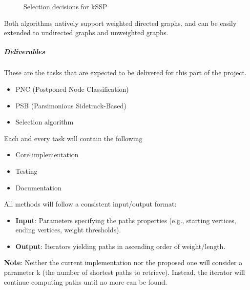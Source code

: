 \begin{figure}[ht]
    \centering

    \caption{Selection decisions for kSSP}
\end{figure}

Both algorithms natively support weighted directed graphs, and can be easily
extended to undirected graphs and unweighted graphs.

\subparagraph{Deliverables}
These are the tasks that are expected to be delivered for this part of the
project.

\begin{itemize}
    \item PNC (Postponed Node Classification)
    \item PSB (Parsimonious Sidetrack-Based)
    \item Selection algorithm
\end{itemize}

Each and every task will contain the following

\begin{itemize}
    \item Core implementation
    \item Testing
    \item Documentation
\end{itemize}

All methods will follow a consistent input/output format:
\begin{itemize}
    \item \textbf{Input}: Parameters specifying the paths properties (e.g., starting vertices, ending vertices, weight thresholds).
    \item \textbf{Output}: Iterators yielding paths in ascending order of weight/length.
\end{itemize}

\textbf{Note}: Neither the current implementation nor the proposed one will consider a
parameter k (the number of shortest paths to retrieve). Instead, the iterator
will continue computing paths until no more can be found.

